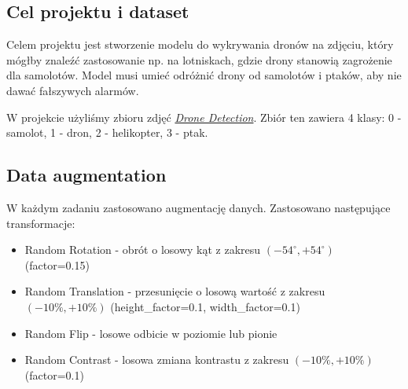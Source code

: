 \subsection{Cel projektu i dataset}
Celem projektu jest stworzenie modelu do wykrywania dronów na zdjęciu, który mógłby znaleźć zastosowanie np. na lotniskach, gdzie drony stanowią zagrożenie dla samolotów. Model musi umieć odróżnić drony od samolotów i ptaków, aby nie dawać fałszywych alarmów.

W projekcie użyliśmy zbioru zdjęć \href{https://www.kaggle.com/datasets/cybersimar08/drone-detection}{\textit{Drone Detection}}. Zbiór ten zawiera 4 klasy: 0 - samolot, 1 - dron, 2 - helikopter, 3 - ptak.

\subsection{Data augmentation}

W każdym zadaniu zastosowano augmentację danych. Zastosowano następujące transformacje:
\begin{itemize}
    \item Random Rotation - obrót o losowy kąt z zakresu $(-54^{\circ} , +54^{\circ})$ (factor=0.15)
    \item Random Translation - przesunięcie o losową wartość z zakresu $(-10\%, +10\%)$ (height\_factor=0.1, width\_factor=0.1)
    \item Random Flip - losowe odbicie w poziomie lub pionie
    \item Random Contrast - losowa zmiana kontrastu z zakresu $(-10\%, +10\%)$ (factor=0.1)
\end{itemize}
